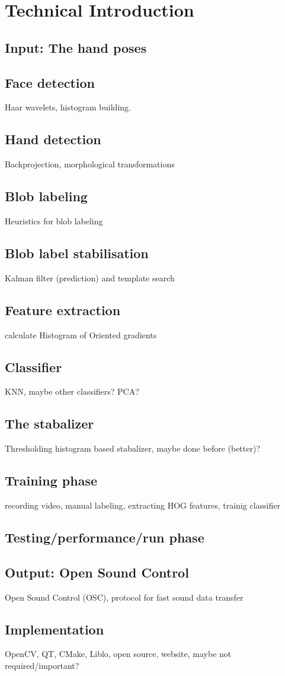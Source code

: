 
\chapter{Technical Introduction}
\label{ch:techintro}

\section{Input: The hand poses}

\section{Face detection}
Haar wavelets, histogram building.

\section{Hand detection}
Backprojection, morphological transformations

\section{Blob labeling}
Heuristics for blob labeling

\section{Blob label stabilisation}
Kalman filter (prediction) and template search

\section{Feature extraction}
calculate Histogram of Oriented gradients\cite{watanabe2009}

\section{Classifier}
KNN, maybe other classifiers? PCA?

\section{The stabalizer}
Thresholding histogram based stabalizer, maybe done before (better)?

\section{Training phase}
recording video, manual labeling, extracting HOG features, trainig classifier

\section{Testing/performance/run phase}


\section{Output: Open Sound Control}
Open Sound Control (OSC), protocol for fast sound data transfer

\section{Implementation}
OpenCV, QT, CMake, Liblo, open source, website, maybe not required/important?
